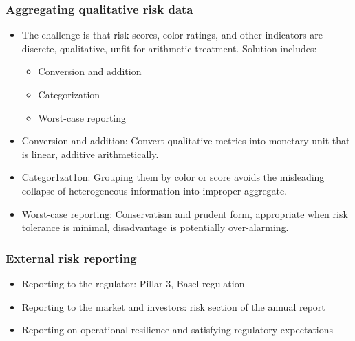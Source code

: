 \subsubsection{Aggregating qualitative risk data}
\begin{itemize}
\item The challenge is that risk scores, color ratings, and other indicators are discrete, qualitative, unfit for arithmetic treatment. Solution includes:
    \begin{itemize}
    \item Conversion and addition
    \item Categorization
    \item Worst-case reporting
    
    \end{itemize}
\item Conversion and addition: Convert qualitative metrics into monetary unit that is linear, additive arithmetically.
\item Categor1zat1on: Grouping them by color or score avoids the misleading collapse of heterogeneous information into improper aggregate.
\item Worst-case reporting: Conservatism and prudent form, appropriate when risk tolerance is minimal, disadvantage is potentially over-alarming.
\end{itemize}


\subsubsection{External risk reporting}
\begin{itemize}
\item Reporting to the regulator: Pillar 3, Basel regulation
\item Reporting to the market and investors: risk section of the annual report
\item Reporting on operational resilience and satisfying regulatory expectations

\end{itemize}


